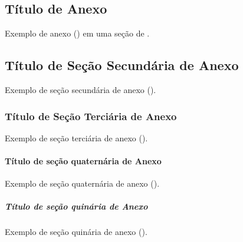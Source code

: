 \begin{Annex}

\section{Título de Anexo}%
\label{sect:anx-a1}

Exemplo de anexo () em uma seção de .

\subsection{Título de Seção Secundária de Anexo}%
\label{ssect:anx-a2}

Exemplo de seção secundária de anexo ().

\subsubsection{Título de Seção Terciária de Anexo}%
\label{sssect:anx-a3}

Exemplo de seção terciária de anexo ().

\paragraph{Título de seção quaternária de Anexo}%
\label{prgh:anx-a4}

Exemplo de seção quaternária de anexo ().

\subparagraph{Título de seção quinária de Anexo}%
\label{sprgh:anx-a5}

Exemplo de seção quinária de anexo ().

\end{Annex}

\printindex%
